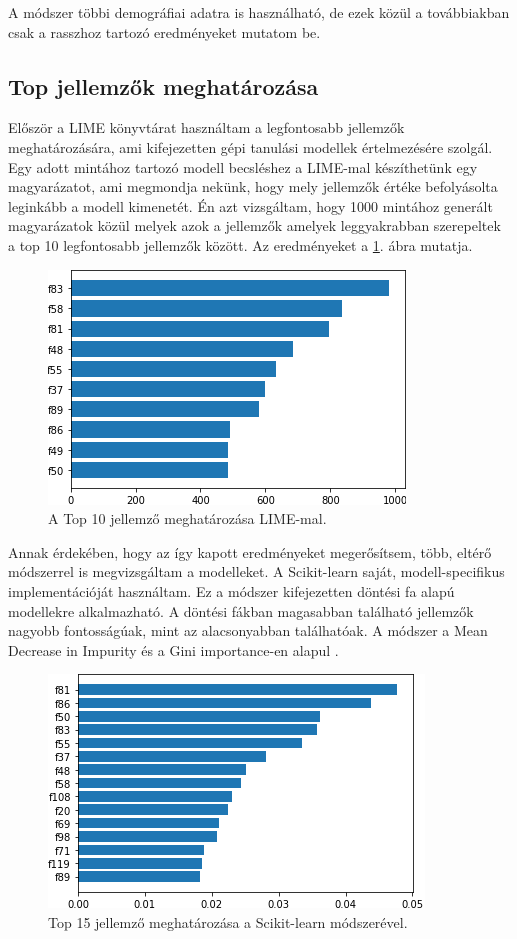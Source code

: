 A módszer többi demográfiai adatra is használható, de ezek közül a továbbiakban csak a rasszhoz tartozó eredményeket mutatom be. 

\subsection{Top jellemzők meghatározása}

Először a LIME \cite{lime2016} könyvtárat használtam a legfontosabb jellemzők meghatározására, ami kifejezetten gépi tanulási modellek értelmezésére szolgál. Egy adott mintához tartozó modell becsléshez a LIME-mal készíthetünk egy magyarázatot, ami megmondja nekünk, hogy mely jellemzők értéke befolyásolta leginkább a modell kimenetét. Én azt vizsgáltam, hogy 1000 mintához generált magyarázatok közül melyek azok a jellemzők amelyek leggyakrabban szerepeltek a top 10 legfontosabb jellemzők között. Az eredményeket a \ref{fig:lime}. ábra mutatja.

\begin{figure}[ht]
	\centering
	\includegraphics[width=0.6\columnwidth]{figures/imp_lime.png}
	\caption{A Top 10 jellemző meghatározása LIME-mal.}
	\label{fig:lime}
\end{figure}

Annak érdekében, hogy az így kapott eredményeket megerősítsem, több, eltérő módszerrel is megvizsgáltam a modelleket. A Scikit-learn saját, modell-specifikus implementációját használtam. Ez a módszer kifejezetten döntési fa alapú modellekre alkalmazható. A döntési fákban magasabban található jellemzők nagyobb fontosságúak, mint az alacsonyabban találhatóak. A módszer a Mean Decrease in Impurity és a Gini importance-en alapul \cite{breiman2017classification}.

\begin{figure}[ht]
	\centering
	\includegraphics[width=0.7\columnwidth]{figures/imp_gini.png}
	\caption{Top 15 jellemző meghatározása a Scikit-learn módszerével.}
\end{figure}


